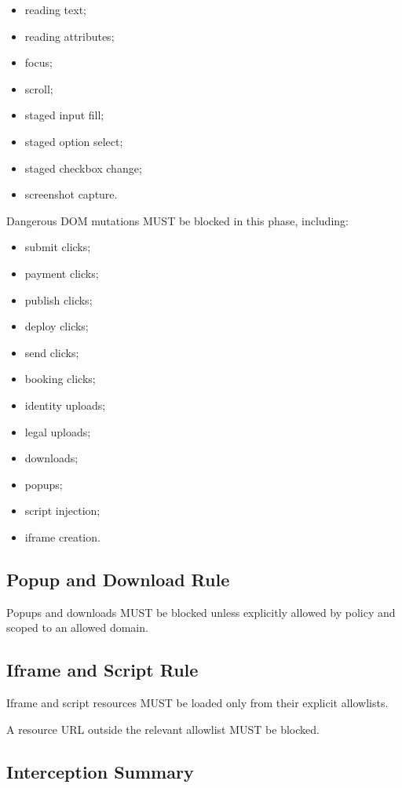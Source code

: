 \begin{itemize}
  \item reading text;
  \item reading attributes;
  \item focus;
  \item scroll;
  \item staged input fill;
  \item staged option select;
  \item staged checkbox change;
  \item screenshot capture.
\end{itemize}

Dangerous DOM mutations MUST be blocked in this phase, including:

\begin{itemize}
  \item submit clicks;
  \item payment clicks;
  \item publish clicks;
  \item deploy clicks;
  \item send clicks;
  \item booking clicks;
  \item identity uploads;
  \item legal uploads;
  \item downloads;
  \item popups;
  \item script injection;
  \item iframe creation.
\end{itemize}

\subsection{Popup and Download Rule}

Popups and downloads MUST be blocked unless explicitly allowed by policy and scoped to an allowed domain.

\subsection{Iframe and Script Rule}

Iframe and script resources MUST be loaded only from their explicit allowlists.

A resource URL outside the relevant allowlist MUST be blocked.

\subsection{Interception Summary}

